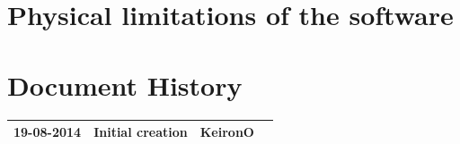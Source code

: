 \documentclass[11pt,a4paper]{article}
\begin{document}
\clearpage

\section{Physical limitations of the software}

\clearpage

\section*{Document History}

\begin{center}
\begin{tabular}{| c | c | c | c |}
\hline
19-08-2014 & Initial creation & KeironO \\
\hline

\hline
\end{tabular}
\end{center}
\clearpage
\end{document}
